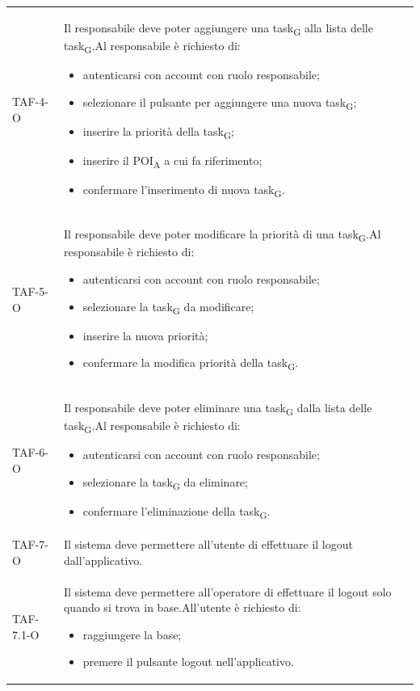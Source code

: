 \begin{longtable}{ >{\centering}p{} >{}p{}
		>{\centering}p{}}
	TAF-4-O & Il responsabile deve poter aggiungere una \gls{task}\textsubscript{G} alla lista delle \gls{task}\textsubscript{G}.\newline Al responsabile è richiesto di: \begin{itemize}\item autenticarsi con account con ruolo responsabile; \item selezionare il pulsante per aggiungere una nuova \gls{task}\textsubscript{G}; \item inserire la priorità della \gls{task}\textsubscript{G}; \item inserire il \acrshort{POI}\textsubscript{A} a cui fa riferimento; \item confermare l'inserimento di nuova \gls{task}\textsubscript{G}. \end{itemize} & 0\tabularnewline
	
	TAF-5-O & Il responsabile deve poter modificare la priorità di una \gls{task}\textsubscript{G}.\newline Al responsabile è richiesto di: \begin{itemize}\item autenticarsi con account con ruolo responsabile; \item selezionare la \gls{task}\textsubscript{G} da modificare; \item inserire la nuova priorità; \item confermare la modifica priorità della \gls{task}\textsubscript{G}. \end{itemize} & 0\tabularnewline
	
	TAF-6-O & Il responsabile deve poter eliminare una \gls{task}\textsubscript{G} dalla lista delle \gls{task}\textsubscript{G}.\newline Al responsabile è richiesto di: \begin{itemize} \item autenticarsi con account con ruolo responsabile; \item selezionare la \gls{task}\textsubscript{G} da eliminare; \item confermare l'eliminazione della \gls{task}\textsubscript{G}. \end{itemize} & 0\tabularnewline
	
	TAF-7-O & Il sistema deve permettere all'utente di effettuare il logout dall'applicativo. & 0\tabularnewline
	
	TAF-7.1-O & Il sistema deve permettere all'operatore di effettuare il logout solo quando si trova in base.\newline All'utente è richiesto di: \begin{itemize} \item raggiungere la base; \item premere il pulsante logout nell'applicativo. \end{itemize} & 0\tabularnewline
	

\end{longtable}
